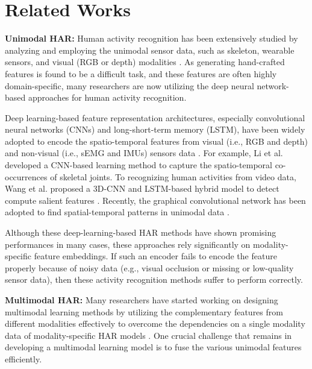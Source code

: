 \documentclass[runningheads]{llncs}
\begin{document}
%
 \section{Related Works}
\label{sec:relatedWorks}

\textbf{Unimodal HAR:} Human activity recognition has been extensively studied by analyzing and employing the unimodal sensor data, such as skeleton, wearable sensors, and visual (RGB or depth) modalities \cite{hussein2013human}.  As generating hand-crafted features is found to be a difficult task, and these features are often highly domain-specific, many researchers are now utilizing the deep neural network-based approaches for human activity recognition. 


Deep learning-based feature representation architectures, especially convolutional neural networks (CNNs) and long-short-term memory (LSTM), have been widely adopted to encode the spatio-temporal features from visual (i.e., RGB and depth) \cite{new_sk_rep,co_occurrence,closer_look_sp,sp_temporal_relation,sp_3d_conv,slowfast} and non-visual (i.e., sEMG and IMUs) sensors data \cite{andi_iros,mit_ucsd,totty2017muscle}. For example, Li et al. \cite{co_occurrence} developed a CNN-based learning method to capture the spatio-temporal co-occurrences of skeletal joints. To recognizing human activities from video data, Wang et al. proposed a 3D-CNN and LSTM-based hybrid model to detect compute salient features \cite{sp_3d_conv_lstm}. 
Recently, the graphical convolutional network has been adopted to find spatial-temporal patterns in unimodal data \cite{st_graph_sk}.





Although these deep-learning-based HAR methods have shown promising performances in many cases, these approaches rely significantly on modality-specific feature embeddings. If such an encoder fails to encode the feature properly because of noisy data (e.g., visual occlusion or missing or low-quality sensor data), then these activity recognition methods suffer to perform correctly.







\textbf{Multimodal HAR:} Many researchers have started working on designing multimodal learning methods by utilizing the complementary features from different modalities effectively to overcome the dependencies on a single modality data of modality-specific HAR models \cite{Garcia_2018_ECCV,keyless,self_attention_iros19,joze2019mmtm}. One crucial challenge that remains in developing a multimodal learning model is to fuse the various unimodal features efficiently. 
\end{document}
